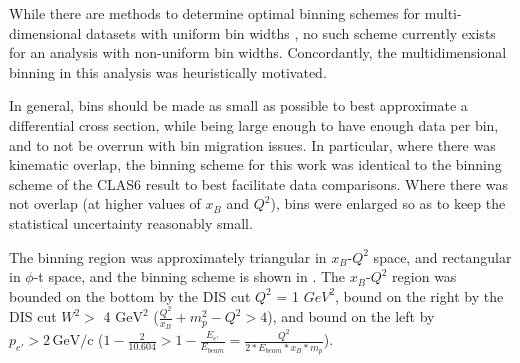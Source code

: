 
While there are methods to determine optimal binning schemes for multi-dimensional datasets with uniform bin widths \parencite{Knuth2019OptimalModels}, no such scheme currently exists for an analysis with non-uniform bin widths. Concordantly, the multidimensional binning in this analysis was heuristically motivated.


In general, bins should be made as small as possible to best approximate a differential cross section, while being large enough to have enough data per bin, and to not be overrun with bin migration issues. In particular, where there was kinematic overlap, the binning scheme for this work was identical to the binning scheme of the CLAS6 result \parencite{Bedlinskiy2014ExclusiveCLAS} to best facilitate data comparisons. Where there was not overlap (at higher values of $x_B$ and $Q^2$), bins were enlarged so as to keep the statistical uncertainty reasonably small. 


The binning region was approximately triangular in $x_B$-$Q^2$ space, and rectangular in $\phi$-t space, and the binning scheme is shown in . The $x_B$-$Q^2$ region was bounded on the bottom by the DIS cut $Q^2$ = 1 $GeV^2$, bound on the right by the DIS cut $W^2 > $ 4 $\text{GeV}^2$ ($\frac{Q^2}{x_B}+m_p^2-Q^2>4$), and bound on the left by $p_{e'} > 2 \, \text{GeV/c}$ ($1-\frac{2}{10.604} > 1-\frac{E_{e'}}{E_{beam}} = \frac{Q^2}{2*E_{beam}*x_B*m_p}$). 


